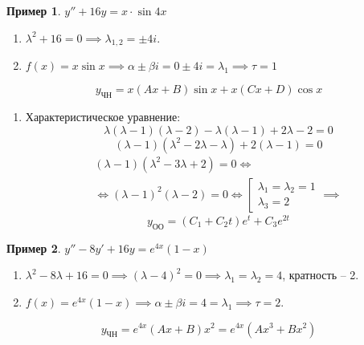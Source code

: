 \documentclass[11pt,a4paper,oneside]{report}
\theoremstyle{definition}
\newtheorem{example}{Пример}
\theoremstyle{plain}
\theoremstyle{remark}
\begin{document}
\begin{example}
    $y'' + 16y = x\cdot \sin 4x$
    \begin{enumerate}
        \item $\lambda^2 + 16 = 0 \implies \lambda_{1,2} = \pm 4i$.
        \item $f(x) = x\sin x \implies \alpha \pm \beta i = 0 \pm 4i = \lambda_1 \implies \tau = 1$
    \end{enumerate}
    \begin{equation*}
        y_{\text{ЧН}} = x(Ax + B)\sin x + x(Cx + D)\cos x
    \end{equation*}
    \begin{enumerate}
        \item Характеристическое уравнение:
              \begin{equation*}
                  \lambda(\lambda - 1)(\lambda-2)-\lambda(\lambda-1)+2\lambda - 2 =0
              \end{equation*}
              \begin{equation*}
                  (\lambda-1)(\lambda^2-2\lambda-\lambda)+2(\lambda-1) = 0
              \end{equation*}
              \begin{multline*}
                  (\lambda - 1)(\lambda^2 - 3\lambda + 2)= 0\iff \\
                  \iff (\lambda-1)^2(\lambda-2) = 0 \iff \left[\begin{array}{l}
                      \lambda_1 = \lambda_2 = 1 \\
                      \lambda_3 = 2
                  \end{array}\right. \implies
              \end{multline*}
              \begin{equation*}
                  y_{\text{ОО}} = (C_1 + C_2t)e^t + C_3e^{2t}
              \end{equation*}
    \end{enumerate}
\end{example}

\begin{example}
    $y'' - 8y' + 16y = e^{4x}(1-x)$
    \begin{enumerate}
        \item $\lambda^2 - 8\lambda + 16 = 0 \implies (\lambda-4)^2 = 0 \implies \lambda_1 = \lambda_2 = 4$, кратность -- 2.
        \item $f(x)= e^{4x}(1-x)\implies \alpha \pm \beta i = 4 = \lambda_1 \implies \tau = 2$.
    \end{enumerate}
    \begin{equation*}
        y_{\text{ЧН}} = e^{4x}(Ax + B)x^2 = e^{4x}(Ax^3 + Bx^2)
    \end{equation*}
\end{example}
\end{document}
